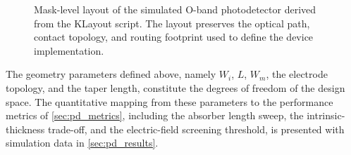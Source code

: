 \begin{figure}[H]
    \centering
    \caption{Mask-level layout of the simulated O-band photodetector derived
    from the KLayout script. The layout preserves the optical path, contact
    topology, and routing footprint used to define the device implementation.}
    \label{fig:klayout_layout}
\end{figure}

The geometry parameters defined above, namely $W_i$, $L$, $W_m$, the electrode
topology, and the taper length, constitute the degrees of freedom of the design
space. The quantitative mapping from these parameters to the performance metrics
of \cref{sec:pd_metrics}, including the absorber length sweep, the
intrinsic-thickness trade-off, and the electric-field screening threshold, is
presented with simulation data in \cref{sec:pd_results}.
